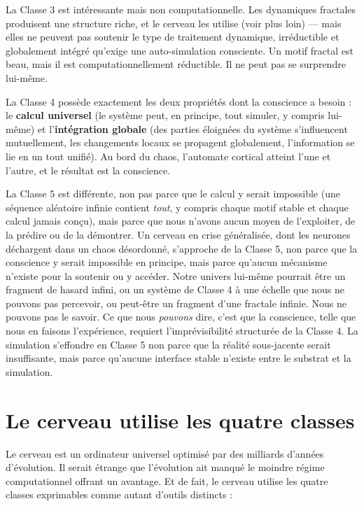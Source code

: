 \documentclass[11pt, twoside, openright]{book}
\begin{document}
La Classe 3 est intéressante mais non computationnelle. Les dynamiques fractales produisent une structure riche, et le cerveau les utilise (voir plus loin) --- mais elles ne peuvent pas soutenir le type de traitement dynamique, irréductible et globalement intégré qu'exige une auto-simulation consciente. Un motif fractal est beau, mais il est computationnellement réductible. Il ne peut pas se surprendre lui-même.

La Classe 4 possède exactement les deux propriétés dont la conscience a besoin : le \textbf{calcul universel} (le système peut, en principe, tout simuler, y compris lui-même) et l'\textbf{intégration globale} (des parties éloignées du système s'influencent mutuellement, les changements locaux se propagent globalement, l'information se lie en un tout unifié). Au bord du chaos, l'automate cortical atteint l'une et l'autre, et le résultat est la conscience.

La Classe 5 est différente, non pas parce que le calcul y serait impossible (une séquence aléatoire infinie contient \textit{tout}, y compris chaque motif stable et chaque calcul jamais conçu), mais parce que nous n'avons aucun moyen de l'exploiter, de la prédire ou de la démontrer. Un cerveau en crise généralisée, dont les neurones déchargent dans un chaos désordonné, s'approche de la Classe 5, non parce que la conscience y serait impossible en principe, mais parce qu'aucun mécanisme n'existe pour la soutenir ou y accéder. Notre univers lui-même pourrait être un fragment de hasard infini, ou un système de Classe 4 à une échelle que nous ne pouvons pas percevoir, ou peut-être un fragment d'une fractale infinie. Nous ne pouvons pas le savoir. Ce que nous \textit{pouvons} dire, c'est que la conscience, telle que nous en faisons l'expérience, requiert l'imprévisibilité structurée de la Classe 4. La simulation s'effondre en Classe 5 non parce que la réalité sous-jacente serait insuffisante, mais parce qu'aucune interface stable n'existe entre le substrat et la simulation.

\section*{Le cerveau utilise les quatre classes}

Le cerveau est un ordinateur universel optimisé par des milliards d'années d'évolution. Il serait étrange que l'évolution ait manqué le moindre régime computationnel offrant un avantage. Et de fait, le cerveau utilise les quatre classes exprimables comme autant d'outils distincts :
\end{document}
